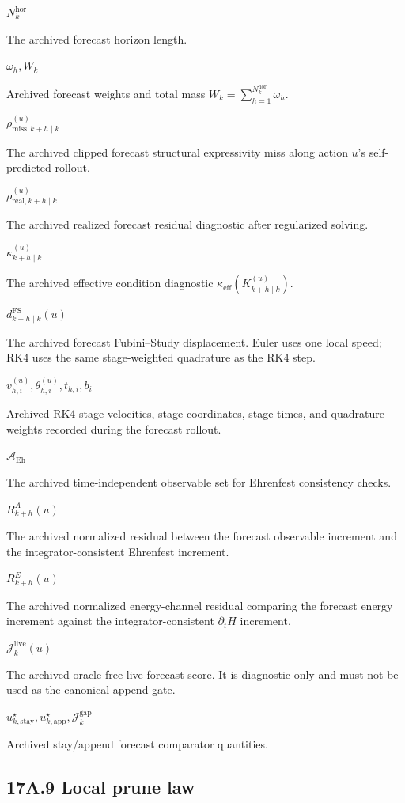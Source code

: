 \documentclass[10pt]{article}
\newcommand{\sym}[2]{%
  \noindent\begin{minipage}[t]{0.29\textwidth}\raggedright\textbf{\ensuremath{#1}}\end{minipage}%
  \hfill
  \begin{minipage}[t]{0.68\textwidth}\raggedright #2\end{minipage}\par\vspace{0.22em}}
\begin{document}
\sym{N_k^{\mathrm{hor}}}{The archived forecast horizon length.}
\sym{\omega_h,W_k}{Archived forecast weights and total mass $W_k=\sum_{h=1}^{N_k^{\mathrm{hor}}}\omega_h$.}
\sym{\rho_{\mathrm{miss},k+h\mid k}^{(u)}}{The archived clipped forecast structural expressivity miss along action $u$'s self-predicted rollout.}
\sym{\rho_{\mathrm{real},k+h\mid k}^{(u)}}{The archived realized forecast residual diagnostic after regularized solving.}
\sym{\kappa_{k+h\mid k}^{(u)}}{The archived effective condition diagnostic $\kappa_{\mathrm{eff}}(K_{k+h\mid k}^{(u)})$.}
\sym{d_{k+h\mid k}^{\mathrm{FS}}(u)}{The archived forecast Fubini--Study displacement. Euler uses one local speed; RK4 uses the same stage-weighted quadrature as the RK4 step.}
\sym{v_{h,i}^{(u)},\theta_{h,i}^{(u)},t_{h,i},b_i}{Archived RK4 stage velocities, stage coordinates, stage times, and quadrature weights recorded during the forecast rollout.}
\sym{\mathcal A_{\mathrm{Eh}}}{The archived time-independent observable set for Ehrenfest consistency checks.}
\sym{R_{k+h}^{A}(u)}{The archived normalized residual between the forecast observable increment and the integrator-consistent Ehrenfest increment.}
\sym{R_{k+h}^{E}(u)}{The archived normalized energy-channel residual comparing the forecast energy increment against the integrator-consistent $\partial_tH$ increment.}
\sym{\mathcal J_k^{\mathrm{live}}(u)}{The archived oracle-free live forecast score. It is diagnostic only and must not be used as the canonical append gate.}
\sym{u_{k,\mathrm{stay}}^\star,u_{k,\mathrm{app}}^\star,\mathcal J_k^{\mathrm{gap}}}{Archived stay/append forecast comparator quantities.}
\subsection*{17A.9 Local prune law}
\end{document}
